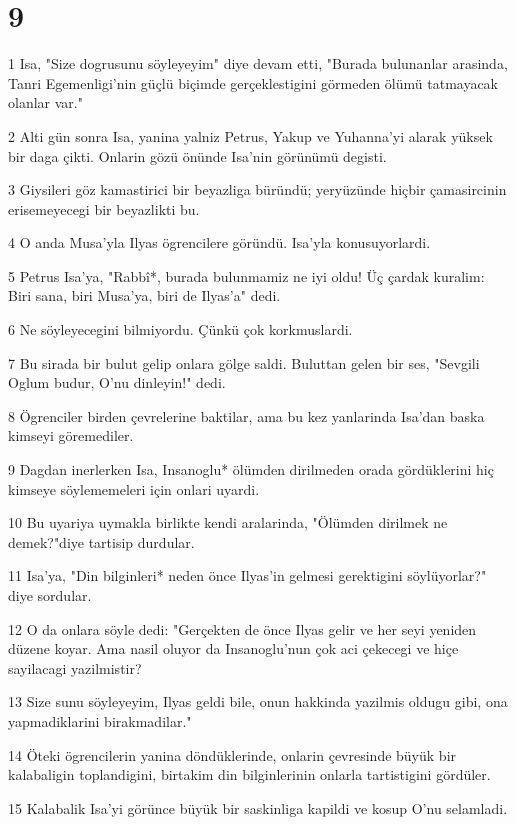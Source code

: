 \chapter{9}

\par 1 Isa, "Size dogrusunu söyleyeyim" diye devam etti, "Burada bulunanlar arasinda, Tanri Egemenligi'nin güçlü biçimde gerçeklestigini görmeden ölümü tatmayacak olanlar var."
\par 2 Alti gün sonra Isa, yanina yalniz Petrus, Yakup ve Yuhanna'yi alarak yüksek bir daga çikti. Onlarin gözü önünde Isa'nin görünümü degisti.
\par 3 Giysileri göz kamastirici bir beyazliga büründü; yeryüzünde hiçbir çamasircinin erisemeyecegi bir beyazlikti bu.
\par 4 O anda Musa'yla Ilyas ögrencilere göründü. Isa'yla konusuyorlardi.
\par 5 Petrus Isa'ya, "Rabbî*, burada bulunmamiz ne iyi oldu! Üç çardak kuralim: Biri sana, biri Musa'ya, biri de Ilyas'a" dedi.
\par 6 Ne söyleyecegini bilmiyordu. Çünkü çok korkmuslardi.
\par 7 Bu sirada bir bulut gelip onlara gölge saldi. Buluttan gelen bir ses, "Sevgili Oglum budur, O'nu dinleyin!" dedi.
\par 8 Ögrenciler birden çevrelerine baktilar, ama bu kez yanlarinda Isa'dan baska kimseyi göremediler.
\par 9 Dagdan inerlerken Isa, Insanoglu* ölümden dirilmeden orada gördüklerini hiç kimseye söylememeleri için onlari uyardi.
\par 10 Bu uyariya uymakla birlikte kendi aralarinda, "Ölümden dirilmek ne demek?"diye tartisip durdular.
\par 11 Isa'ya, "Din bilginleri* neden önce Ilyas'in gelmesi gerektigini söylüyorlar?" diye sordular.
\par 12 O da onlara söyle dedi: "Gerçekten de önce Ilyas gelir ve her seyi yeniden düzene koyar. Ama nasil oluyor da Insanoglu'nun çok aci çekecegi ve hiçe sayilacagi yazilmistir?
\par 13 Size sunu söyleyeyim, Ilyas geldi bile, onun hakkinda yazilmis oldugu gibi, ona yapmadiklarini birakmadilar."
\par 14 Öteki ögrencilerin yanina döndüklerinde, onlarin çevresinde büyük bir kalabaligin toplandigini, birtakim din bilginlerinin onlarla tartistigini gördüler.
\par 15 Kalabalik Isa'yi görünce büyük bir saskinliga kapildi ve kosup O'nu selamladi.
